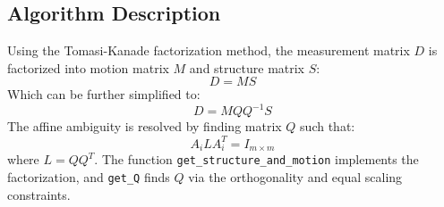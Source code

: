 {\subsection{Algorithm Description}
Using the Tomasi-Kanade factorization method, the measurement matrix \( D \) is factorized into motion matrix \( M \) and structure matrix \( S \):
\begin{equation}
	D = MS
\end{equation}
Which can be further simplified to:
\begin{equation}
	D = MQQ^{-1}S
\end{equation}
The affine ambiguity is resolved by finding matrix \( Q \) such that:
\begin{equation}
	A_i L A_i^T = I_{m \times m}
\end{equation}
where \( L = Q Q^T \). The function \texttt{get\_structure\_and\_motion} implements the factorization, and \texttt{get\_Q} finds \( Q \) via the orthogonality and equal scaling constraints.

}
